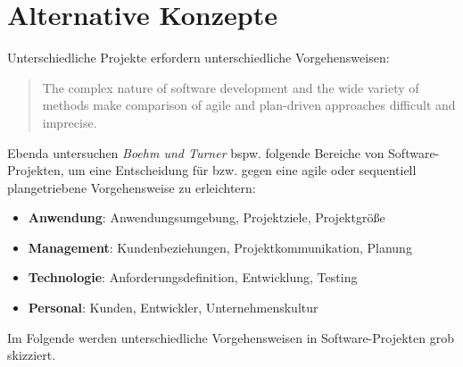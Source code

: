 \section{Alternative Konzepte}

\noindent
Unterschiedliche Projekte erfordern unterschiedliche Vorgehensweisen:

\blockquote[{\cite[25]{BT04}}]{
    The complex nature of software development and the wide variety of
    methods make comparison of agile and plan-driven approaches difficult
    and imprecise.
}

\noindent
Ebenda untersuchen \textit{Boehm und Turner} bspw. folgende Bereiche von Software-Projekten, um eine Entscheidung für bzw. gegen eine agile oder sequentiell plangetriebene Vorgehensweise zu erleichtern:

\begin{itemize}
    \item \textbf{Anwendung}: Anwendungsumgebung, Projektziele, Projektgröße
    \item \textbf{Management}: Kundenbeziehungen, Projektkommunikation, Planung
    \item \textbf{Technologie}: Anforderungsdefinition, Entwicklung, Testing
    \item \textbf{Personal}: Kunden, Entwickler, Unternehmenskultur
\end{itemize}

\noindent
Im Folgende werden unterschiedliche Vorgehensweisen in Software-Projekten grob skizziert.

